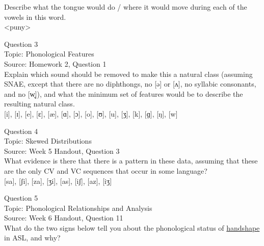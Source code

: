 \documentclass[12pt]{article}
\begin{document}
Describe what the tongue would do / where it would move during each of the vowels in this word.\\

<puny>


\newpage

{\large Question 3}\\

Topic: Phonological Features\\
Source: Homework 2, Question 1\\

Explain which sound should be removed to make this a natural class (assuming SNAE, except that there are no diphthongs, no [ə] or [ʌ], no syllabic consonants, and no [w̥]), and what the minimum set of features would be to describe the resulting natural class.\\

{[i]}, {[ɪ]}, {[e]}, {[ɛ]}, {[æ]}, {[ɑ]}, {[ɔ]}, {[o]}, {[ʊ]}, {[u]}, {[ʒ]}, {[k]}, {[ɡ]}, {[ŋ]}, {[w]}


\newpage

{\large Question 4}\\

Topic: Skewed Distributions\\
Source: Week 5 Handout, Question 3\\

What evidence is there that there is a pattern in these data, assuming that these are the only CV and VC sequences that occur in some language?\\

{[sa]}, {[ʃi]}, {[za]}, {[ʒi]}, {[as]}, {[iʃ]}, {[az]}, {[iʒ]}


\newpage

{\large Question 5}\\

Topic: Phonological Relationships and Analysis\\
Source: Week 6 Handout, Question 11\\

What do the two signs below tell you about the phonological status of \underline{handshape} in ASL, and why?\\
\end{document}
